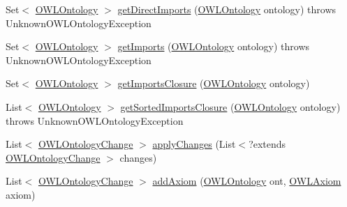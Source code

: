 \begin{DoxyCompactItemize}
\item 
Set$<$ \hyperlink{interfaceorg_1_1semanticweb_1_1owlapi_1_1model_1_1_o_w_l_ontology}{O\-W\-L\-Ontology} $>$ \hyperlink{classuk_1_1ac_1_1manchester_1_1cs_1_1owl_1_1owlapi_1_1_o_w_l_ontology_manager_impl_a90deb4b3346167fc91de6be29b28314e}{get\-Direct\-Imports} (\hyperlink{interfaceorg_1_1semanticweb_1_1owlapi_1_1model_1_1_o_w_l_ontology}{O\-W\-L\-Ontology} ontology)  throws Unknown\-O\-W\-L\-Ontology\-Exception 
\item 
Set$<$ \hyperlink{interfaceorg_1_1semanticweb_1_1owlapi_1_1model_1_1_o_w_l_ontology}{O\-W\-L\-Ontology} $>$ \hyperlink{classuk_1_1ac_1_1manchester_1_1cs_1_1owl_1_1owlapi_1_1_o_w_l_ontology_manager_impl_a46cd8e1986ada2f9a0a996f8fba18c97}{get\-Imports} (\hyperlink{interfaceorg_1_1semanticweb_1_1owlapi_1_1model_1_1_o_w_l_ontology}{O\-W\-L\-Ontology} ontology)  throws Unknown\-O\-W\-L\-Ontology\-Exception 
\item 
Set$<$ \hyperlink{interfaceorg_1_1semanticweb_1_1owlapi_1_1model_1_1_o_w_l_ontology}{O\-W\-L\-Ontology} $>$ \hyperlink{classuk_1_1ac_1_1manchester_1_1cs_1_1owl_1_1owlapi_1_1_o_w_l_ontology_manager_impl_abfa8b08d95aa0c80305539e2018e2340}{get\-Imports\-Closure} (\hyperlink{interfaceorg_1_1semanticweb_1_1owlapi_1_1model_1_1_o_w_l_ontology}{O\-W\-L\-Ontology} ontology)
\item 
List$<$ \hyperlink{interfaceorg_1_1semanticweb_1_1owlapi_1_1model_1_1_o_w_l_ontology}{O\-W\-L\-Ontology} $>$ \hyperlink{classuk_1_1ac_1_1manchester_1_1cs_1_1owl_1_1owlapi_1_1_o_w_l_ontology_manager_impl_ac6ca3af07dbb4ce6c55ddb05b4d2505c}{get\-Sorted\-Imports\-Closure} (\hyperlink{interfaceorg_1_1semanticweb_1_1owlapi_1_1model_1_1_o_w_l_ontology}{O\-W\-L\-Ontology} ontology)  throws Unknown\-O\-W\-L\-Ontology\-Exception 
\item 
List$<$ \hyperlink{classorg_1_1semanticweb_1_1owlapi_1_1model_1_1_o_w_l_ontology_change}{O\-W\-L\-Ontology\-Change} $>$ \hyperlink{classuk_1_1ac_1_1manchester_1_1cs_1_1owl_1_1owlapi_1_1_o_w_l_ontology_manager_impl_a3b7ec2487859ce70a7252b00d3a17308}{apply\-Changes} (List$<$?extends \hyperlink{classorg_1_1semanticweb_1_1owlapi_1_1model_1_1_o_w_l_ontology_change}{O\-W\-L\-Ontology\-Change} $>$ changes)
\item 
List$<$ \hyperlink{classorg_1_1semanticweb_1_1owlapi_1_1model_1_1_o_w_l_ontology_change}{O\-W\-L\-Ontology\-Change} $>$ \hyperlink{classuk_1_1ac_1_1manchester_1_1cs_1_1owl_1_1owlapi_1_1_o_w_l_ontology_manager_impl_a96d6a3b864cf3d7d8f37e175b4c084c8}{add\-Axiom} (\hyperlink{interfaceorg_1_1semanticweb_1_1owlapi_1_1model_1_1_o_w_l_ontology}{O\-W\-L\-Ontology} ont, \hyperlink{interfaceorg_1_1semanticweb_1_1owlapi_1_1model_1_1_o_w_l_axiom}{O\-W\-L\-Axiom} axiom)

\end{DoxyCompactItemize}
